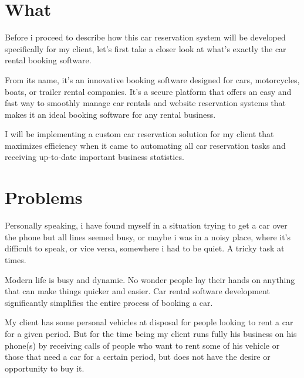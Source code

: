 \documentclass{article}
\begin{document}
\newcommand{\HRule}{\rule{\linewidth}{0.5mm}}



\newpage

\section{What}

    Before i proceed to describe how this car reservation system will be developed specifically for my client, let's first take a closer look at what’s exactly the car rental booking software. 
    
    \vspace{0.3cm}
    
    From its name, it’s an innovative booking software designed for cars, motorcycles, boats, or trailer rental companies. It's a secure platform that offers an easy and fast way to smoothly manage car rentals and website reservation systems that makes it an ideal booking software for any rental business.
    
    \vspace{0.3cm}
    
    I will be implementing a custom car reservation solution for my client that maximizes efficiency when it came to automating all car reservation tasks and receiving up-to-date important business statistics.

\section{Problems}

       Personally speaking, i have found myself in a situation trying to get a car over the phone but all lines seemed busy, or maybe i was in a noisy place, where it’s difficult to speak, or vice versa, somewhere i had to be quiet. A tricky task at times.

        \vspace{0.3cm}

       Modern life is busy and dynamic. No wonder people lay their hands on anything that can make things quicker and easier. Car rental software development significantly simplifies the entire process of booking a car. 
        
        \vspace{0.3cm}
        
        My client has some personal vehicles at disposal for people looking to rent a car for a given period. But for the time being my client runs fully his business on his phone(s) by receiving calls of people who want to rent some of his vehicle or those that need a car for a certain period, but does not have the desire or opportunity to buy it.
        
\end{document}
